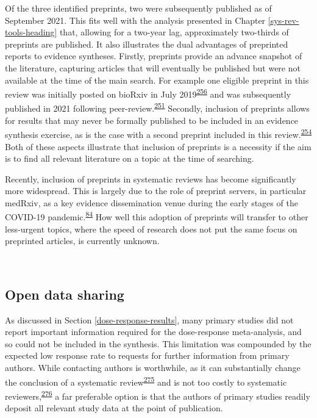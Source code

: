 \documentclass[a4paper, twoside]{templates/ociamthesis}
\begin{document}
Of the three identified preprints, two were subsequently published as of September 2021. This fits well with the analysis presented in Chapter \ref{sys-rev-tools-heading} that, allowing for a two-year lag, approximately two-thirds of preprints are published. It also illustrates the dual advantages of preprinted reports to evidence syntheses. Firstly, preprints provide an advance snapshot of the literature, capturing articles that will eventually be published but were not available at the time of the main search. For example one eligible preprint in this review was initially posted on bioRxiv in July 2019\textsuperscript{\protect\hyperlink{ref-andrews2019}{256}} and was subsequently published in 2021 following peer-review.\textsuperscript{\protect\hyperlink{ref-andrews2021}{251}} Secondly, inclusion of preprints allows for results that may never be formally published to be included in an evidence synthesis exercise, as is the case with a second preprint included in this review.\textsuperscript{\protect\hyperlink{ref-so2017}{254}} Both of these aspects illustrate that inclusion of preprints is a necessity if the aim is to find all relevant literature on a topic at the time of searching.

Recently, inclusion of preprints in systematic reviews has become significantly more widespread. This is largely due to the role of preprint servers, in particular medRxiv, as a key evidence dissemination venue during the early stages of the COVID-19 pandemic.\textsuperscript{\protect\hyperlink{ref-fraser2020preprinting}{84}} How well this adoption of preprints will transfer to other less-urgent topics, where the speed of research does not put the same focus on preprinted articles, is currently unknown.

~

\hypertarget{sys-rev-open-data}{%
\subsection{Open data sharing}\label{sys-rev-open-data}}

As discussed in Section \ref{dose-response-results}, many primary studies did not report important information required for the dose-response meta-analysis, and so could not be included in the synthesis. This limitation was compounded by the expected low response rate to requests for further information from primary authors. While contacting authors is worthwhile, as it can substantially change the conclusion of a systematic review\textsuperscript{\protect\hyperlink{ref-meursingereynders2019}{275}} and is not too costly to systematic reviewers,\textsuperscript{\protect\hyperlink{ref-cooper2019}{276}} a far preferable option is that the authors of primary studies readily deposit all relevant study data at the point of publication.
\end{document}
